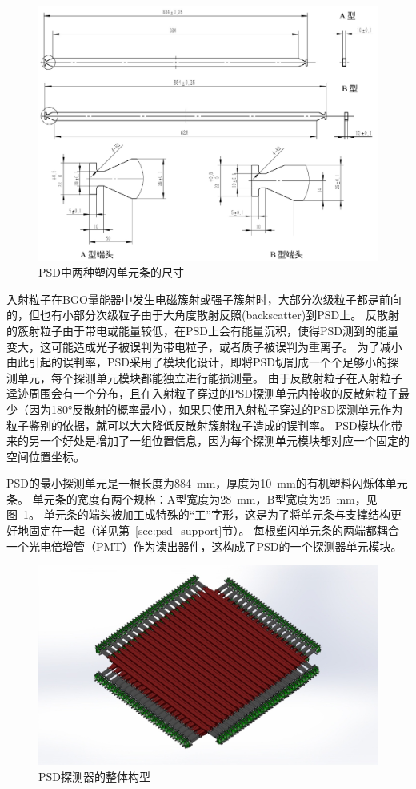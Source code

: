\begin{figure}[b!]
	\centering
	\includegraphics[width=\linewidth]{chap/description/fig/bars}
	\caption{PSD中两种塑闪单元条的尺寸}
	\label{fig:ch2:bars}
\end{figure}

入射粒子在BGO量能器中发生电磁簇射或强子簇射时，大部分次级粒子都是前向的，但也有小部分次级粒子由于大角度散射反照(backscatter)到PSD上。
反散射的簇射粒子由于带电或能量较低，在PSD上会有能量沉积，使得PSD测到的能量变大，这可能造成光子被误判为带电粒子，或者质子被误判为重离子。
为了减小由此引起的误判率，PSD采用了模块化设计，即将PSD切割成一个个足够小的探测单元，每个探测单元模块都能独立进行能损测量。
由于反散射粒子在入射粒子迳迹周围会有一个分布，且在入射粒子穿过的PSD探测单元内接收的反散射粒子最少（因为\ang{180}反散射的概率最小），如果只使用入射粒子穿过的PSD探测单元作为粒子鉴别的依据，就可以大大降低反散射簇射粒子造成的误判率。
PSD模块化带来的另一个好处是增加了一组位置信息，因为每个探测单元模块都对应一个固定的空间位置坐标。

PSD的最小探测单元是一根长度为\SI{884}{\milli\meter}，厚度为\SI{10}{\milli\meter}的有机塑料闪烁体单元条。
单元条的宽度有两个规格：A型宽度为\SI{28}{\milli\meter}，B型宽度为\SI{25}{\milli\meter}，见图~\ref{fig:ch2:bars}。
单元条的端头被加工成特殊的“工”字形，这是为了将单元条与支撑结构更好地固定在一起（详见第~\ref{sec:psd_support}节）。
每根塑闪单元条的两端都耦合一个光电倍增管（PMT）作为读出器件，这构成了PSD的一个探测器单元模块。

\begin{figure}[h!]
	\centering
	\includegraphics[width=0.72\linewidth]{chap/description/fig/psd_detector}
	\caption{PSD探测器的整体构型}
	\label{fig:ch2:psd_explosion}
\end{figure}

